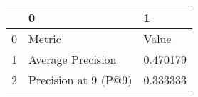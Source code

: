 \begin{tabular}{lll}
\toprule
{} &                     0 &         1 \\
\midrule
0 &                Metric &     Value \\
1 &     Average Precision &  0.470179 \\
2 &  Precision at 9 (P@9) &  0.333333 \\
\bottomrule
\end{tabular}
